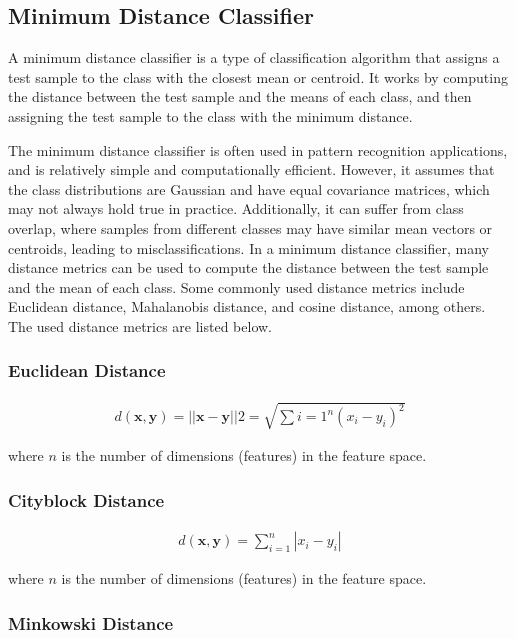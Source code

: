 \documentclass[12pt, a4paper]{article}
\begin{document}
\subsection{Minimum Distance Classifier}

A minimum distance classifier is a type of classification algorithm that assigns a test sample to the class with the closest mean or centroid. It works by computing the distance between the test sample and the means of each class, and then assigning the test sample to the class with the minimum distance.

The minimum distance classifier is often used in pattern recognition applications, and is relatively simple and computationally efficient. However, it assumes that the class distributions are Gaussian and have equal covariance matrices, which may not always hold true in practice. Additionally, it can suffer from class overlap, where samples from different classes may have similar mean vectors or centroids, leading to misclassifications.
In a minimum distance classifier, many distance metrics can be used to compute the distance between the test sample and the mean of each class. Some commonly used distance metrics include Euclidean distance, Mahalanobis distance, and cosine distance, among others. The used distance metrics are listed below.

\subsubsection{Euclidean Distance}


\begin{align}
d(\boldsymbol{x},\boldsymbol{y}) = ||\boldsymbol{x} - \boldsymbol{y}||2 = \sqrt{\sum{i=1}^n (x_i - y_i)^2}
\end{align}

where $n$ is the number of dimensions (features) in the feature space.

\subsubsection{Cityblock Distance}

\begin{align}
d(\boldsymbol{x},\boldsymbol{y}) = \sum_{i=1}^n |x_i - y_i|
\end{align}

where $n$ is the number of dimensions (features) in the feature space.

\subsubsection{Minkowski Distance}
\end{document}
